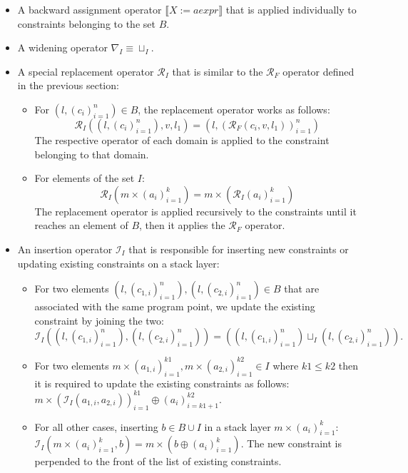 \documentclass[]{report}
\begin{document}
\begin{itemize}
	\item A backward assignment operator $ \llbracket X := aexpr \rrbracket $ that is applied individually to constraints belonging to the set $ B $. 
	
	\item A widening operator $ \nabla_{I} \equiv \sqcup_{I} .$
	\item A special replacement operator $ \mathcal{R}_{I} $ that is similar to the $ \mathcal{R}_{F} $ operator defined in the previous section:
	\begin{itemize}
		\item For $ (l, (c_{i})_{i=1}^{n}) \in B$, the replacement operator works as follows: $$ \mathcal{R}_{I}((l, (c_{i})_{i=1}^{n}), v, l_{1}) = (l, (\mathcal{R}_{F}(c_{i}, v, l_{1}))_{i=1}^{n}) $$ The respective operator of each domain is applied to the constraint belonging to that domain. 
		\item For elements of the set $ I $: $$ \mathcal{R}_{I}(m \times (a_{i})_{i=1}^{k}) = m \times (\mathcal{R}_{I}(a_{i})_{i=1}^{k}) $$ The replacement operator is applied recursively to the constraints until it reaches an element of $ B $, then it applies the $ \mathcal{R}_{F} $ operator. 
	\end{itemize}
	\item An insertion operator $ \mathcal{I}_{I} $ that is responsible for inserting new constraints or updating existing constraints on a stack layer:
	\begin{itemize}
		\item For two elements $ (l, (c_{1,i})_{i=1}^{n}), (l, (c_{2,i})_{i=1}^{n} ) \in B $ that are associated with the same program point, we update the existing constraint by joining the two: $ \mathcal{I}_{I}((l, (c_{1,i})_{i=1}^{n}), (l, (c_{2,i})_{i=1}^{n})) = ((l, (c_{1,i})_{i=1}^{n}) \sqcup_{I} (l, (c_{2,i})_{i=1}^{n})).$
		\item For two elements $ m \times (a_{1,i})_{i=1}^{k1}, m \times (a_{2,i})_{i=1}^{k2} \in I $ where $ k1 \leq k2 $ then it is required to update the existing constraints as follows: $ m \times (\mathcal{I}_{I}(a_{1,i}, a_{2,i}))_{i=1}^{k1} \oplus (a_{i})_{i=k1+1}^{k2}.$ 
		
		\item For all other cases, inserting $ b \in B \cup I$ in a stack layer $ m \times (a_{i})_{i=1}^{k} $: $ \mathcal{I}_{I}(m \times (a_{i})_{i=1}^{k}, b) = m \times (b \oplus (a_{i})_{i=1}^{k})$. The new constraint is perpended to the front of the list of existing constraints. 
	\end{itemize}
\end{itemize}
\end{document}
